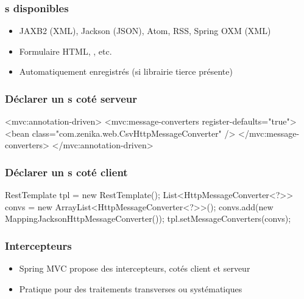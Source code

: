 \begin{frame}
 \frametitle{s disponibles}
 
 \begin{itemize}
  \item JAXB2 (XML), Jackson (JSON), Atom, RSS, Spring OXM (XML)
  \item Formulaire HTML, , etc.
  \item Automatiquement enregistrés (si librairie tierce présente)
 \end{itemize}

\end{frame} 

\begin{frame}[fragile]
 \frametitle{Déclarer un s coté serveur} 
 
 \begin{xmlcode}
<mvc:annotation-driven>
  <mvc:message-converters register-defaults="true">
    <bean class="com.zenika.web.CsvHttpMessageConverter" />
  </mvc:message-converters>
</mvc:annotation-driven>
 \end{xmlcode}

\end{frame} 

\begin{frame}[fragile]
 \frametitle{Déclarer un s coté client} 
 
 \begin{javacode}
RestTemplate tpl = new RestTemplate();
List<HttpMessageConverter<?>> convs = 
  new ArrayList<HttpMessageConverter<?>>();
convs.add(new MappingJacksonHttpMessageConverter());
tpl.setMessageConverters(convs);
 \end{javacode}

\end{frame} 

\begin{frame}
 \frametitle{Intercepteurs} 
 
 \begin{itemize}
  \item Spring MVC propose des intercepteurs, cotés client et serveur
  \item Pratique pour des traitements transverses ou systématiques
 \end{itemize}

\end{frame} 

